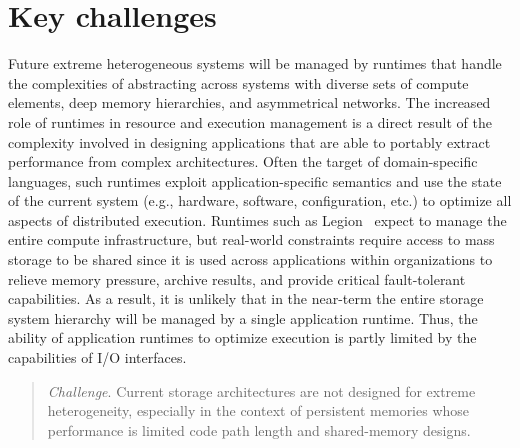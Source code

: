 \documentclass{sig-alternate}
\begin{document}

\date{30 July 1999}

\maketitle

\section{Key challenges}

Future extreme heterogeneous systems will be managed by runtimes that handle the
complexities of abstracting across systems with diverse sets of compute
elements, deep memory hierarchies, and asymmetrical networks.  The increased
role of runtimes in resource and execution management is a direct result of the
complexity involved in designing applications that are able to portably extract
performance from complex architectures.  Often the target of domain-specific
languages, such runtimes exploit application-specific semantics and use the
state of the current system (e.g., hardware, software, configuration, etc.) to
optimize all aspects of distributed execution. Runtimes such as Legion~\cite{bauer:sc12-legion}
expect to manage the entire compute infrastructure, but real-world constraints
require access to mass storage to be shared since it is used across applications
within organizations to relieve memory pressure, archive results, and provide
critical fault-tolerant capabilities. As a result, it is unlikely that in the
near-term the entire storage system hierarchy will be managed by a single
application runtime. Thus, the ability of application runtimes to optimize
execution is partly limited by the capabilities of I/O interfaces.

\begin{quote}
  \emph{Challenge}. Current storage architectures are not designed for extreme
  heterogeneity, especially in the context of persistent memories whose
  performance is limited code path length and shared-memory designs.
\end{quote}
\end{document}
